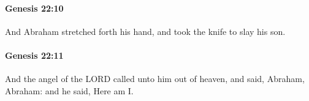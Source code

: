 		\paragraph{Genesis 22:10} %
			\label{GENESIS-22-10}

			And Abraham stretched forth his hand, and took the knife to slay his son.


		\paragraph{Genesis 22:11} %
			\label{GENESIS-22-11}

			And the angel of the LORD called unto him out of heaven, and said, Abraham, Abraham: and he said, Here am I.


